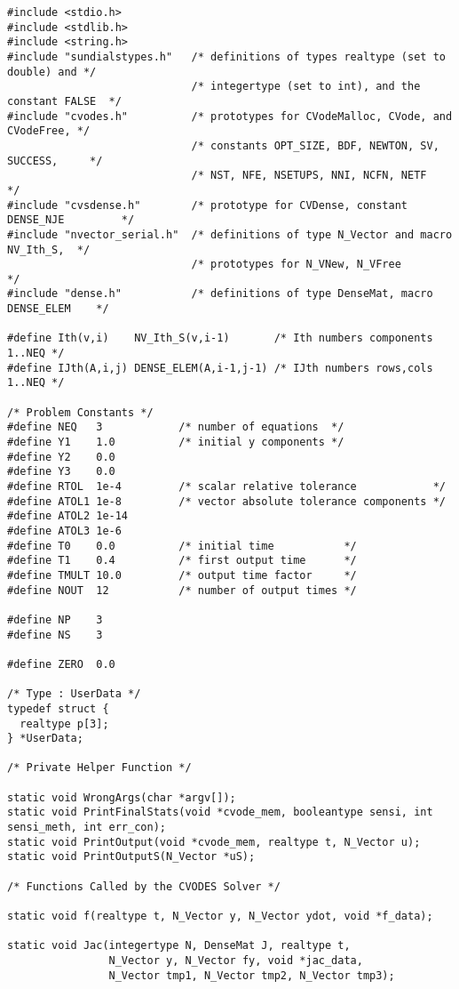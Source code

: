 \begin{verbatim}
#include <stdio.h>
#include <stdlib.h>
#include <string.h>
#include "sundialstypes.h"   /* definitions of types realtype (set to double) and */
                             /* integertype (set to int), and the constant FALSE  */
#include "cvodes.h"          /* prototypes for CVodeMalloc, CVode, and CVodeFree, */
                             /* constants OPT_SIZE, BDF, NEWTON, SV, SUCCESS,     */
                             /* NST, NFE, NSETUPS, NNI, NCFN, NETF                */
#include "cvsdense.h"        /* prototype for CVDense, constant DENSE_NJE         */
#include "nvector_serial.h"  /* definitions of type N_Vector and macro NV_Ith_S,  */
                             /* prototypes for N_VNew, N_VFree                    */
#include "dense.h"           /* definitions of type DenseMat, macro DENSE_ELEM    */

#define Ith(v,i)    NV_Ith_S(v,i-1)       /* Ith numbers components 1..NEQ */
#define IJth(A,i,j) DENSE_ELEM(A,i-1,j-1) /* IJth numbers rows,cols 1..NEQ */

/* Problem Constants */
#define NEQ   3            /* number of equations  */
#define Y1    1.0          /* initial y components */
#define Y2    0.0
#define Y3    0.0
#define RTOL  1e-4         /* scalar relative tolerance            */
#define ATOL1 1e-8         /* vector absolute tolerance components */
#define ATOL2 1e-14
#define ATOL3 1e-6
#define T0    0.0          /* initial time           */
#define T1    0.4          /* first output time      */
#define TMULT 10.0         /* output time factor     */
#define NOUT  12           /* number of output times */

#define NP    3
#define NS    3

#define ZERO  0.0

/* Type : UserData */
typedef struct {
  realtype p[3];
} *UserData;

/* Private Helper Function */

static void WrongArgs(char *argv[]);
static void PrintFinalStats(void *cvode_mem, booleantype sensi, int sensi_meth, int err_con);
static void PrintOutput(void *cvode_mem, realtype t, N_Vector u);
static void PrintOutputS(N_Vector *uS);

/* Functions Called by the CVODES Solver */

static void f(realtype t, N_Vector y, N_Vector ydot, void *f_data);

static void Jac(integertype N, DenseMat J, realtype t,
                N_Vector y, N_Vector fy, void *jac_data, 
                N_Vector tmp1, N_Vector tmp2, N_Vector tmp3);


\end{verbatim}
